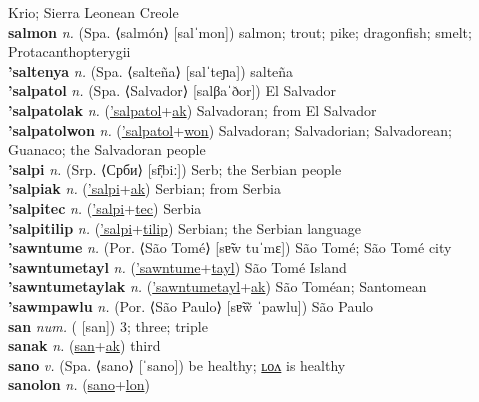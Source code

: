 Krio; Sierra Leonean Creole \label{'salontilip} \\
\textbf{salmon} \textit{n.} (Spa. ⟨salmón⟩ [salˈmon])
salmon; trout; pike; dragonfish; smelt; Protacanthopterygii \label{salmon} \\
\textbf{'saltenya} \textit{n.} (Spa. ⟨salteña⟩ [salˈteɲa])
salteña \label{'saltenya} \\
\textbf{'salpatol} \textit{n.} (Spa. ⟨Salvador⟩ [salβaˈðor])
El Salvador \label{'salpatol} \\
\textbf{'salpatolak} \textit{n.} (\hyperref['salpatol]{'salpatol}+\hyperref[ak]{ak})
Salvadoran; from El Salvador \label{'salpatolak} \\
\textbf{'salpatolwon} \textit{n.} (\hyperref['salpatol]{'salpatol}+\hyperref[won]{won})
Salvadoran; Salvadorian; Salvadorean; Guanaco; the Salvadoran people \label{'salpatolwon} \\
\textbf{'salpi} \textit{n.} (Srp. ⟨Срби⟩ [sr̩̂biː])
Serb; the Serbian people \label{'salpi} \\
\textbf{'salpiak} \textit{n.} (\hyperref['salpi]{'salpi}+\hyperref[ak]{ak})
Serbian; from Serbia \label{'salpiak} \\
\textbf{'salpitec} \textit{n.} (\hyperref['salpi]{'salpi}+\hyperref[tec]{tec})
Serbia \label{'salpitec} \\
\textbf{'salpitilip} \textit{n.} (\hyperref['salpi]{'salpi}+\hyperref[tilip]{tilip})
Serbian; the Serbian language \label{'salpitilip} \\
\textbf{'sawntume} \textit{n.} (Por. ⟨São Tomé⟩ [sɐ̃w tuˈmɛ])
São Tomé; São Tomé city \label{'sawntume} \\
\textbf{'sawntumetayl} \textit{n.} (\hyperref['sawntume]{'sawntume}+\hyperref[tayl]{tayl})
São Tomé Island \label{'sawntumetayl} \\
\textbf{'sawntumetaylak} \textit{n.} (\hyperref['sawntumetayl]{'sawntumetayl}+\hyperref[ak]{ak})
São Toméan; Santomean \label{'sawntumetaylak} \\
\textbf{'sawmpawlu} \textit{n.} (Por. ⟨São Paulo⟩ [sɐ̃w̃ ˈpawlu])
São Paulo \label{'sawmpawlu} \\
\textbf{san} \textit{num.} ( [san])
3; three; triple \label{san} \\
\textbf{sanak} \textit{n.} (\hyperref[san]{san}+\hyperref[ak]{ak})
third \label{sanak} \\
\textbf{sano} \textit{v.} (Spa. ⟨sano⟩ [ˈsano])
be healthy; \hyperref[sanolon]{ʟᴏᴧ} is healthy \label{sano} \\
\textbf{sanolon} \textit{n.} (\hyperref[sano]{sano}+\hyperref[lon]{lon})

